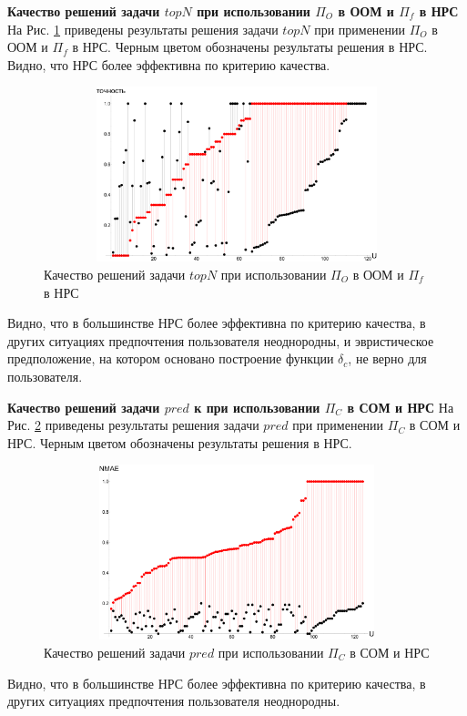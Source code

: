 {\bf Качество решений задачи $topN$ при использовании $\Pi_O$ в ООМ и $\Pi_f$ в
НРС}\\
На Рис. \ref{pic:topn_pio_pif} приведены результаты решения
задачи $topN$ при применении $\Pi_O$ в ООМ и $\Pi_f$ в НРС.
Черным цветом обозначены результаты решения в НРС.
Видно, что НРС более эффективна по критерию качества.

\begin{figure}[H]
	\caption{Качество решений задачи $topN$ при использовании $\Pi_O$ в ООМ и
	$\Pi_f$ в НРС}
	\label{pic:topn_pio_pif}
	\begin{center}
		\includegraphics[width=5in,height=2in]{pics/results/topn_oom_fuzz.pdf}
\end{center}
\end{figure}
Видно, что в большинстве НРС более эффективна по критерию качества,
в других ситуациях предпочтения пользователя неоднородны,
и эвристическое предположение, на котором основано построение
функции $\delta_c$, не верно для пользователя.


{\bf Качество решений задачи $pred$ к при использовании $\Pi_C$ в СОМ и НРС}
На Рис. \ref{pic:pred_pic} приведены результаты решения
задачи $pred$ при применении $\Pi_C$ в СОМ и НРС.
Черным цветом обозначены результаты решения в НРС.

\begin{figure}[H]
	\caption{Качество решений задачи $pred$ при использовании $\Pi_C$ в СОМ и
	НРС}
	\label{pic:pred_pic}
	\begin{center}
		\includegraphics[width=5in,height=2in]{pics/results/ub_method_in_ub_and_fuzz_model.pdf}
\end{center}
\end{figure}
Видно, что в большинстве НРС более эффективна по критерию качества,
в других ситуациях предпочтения пользователя неоднородны.


